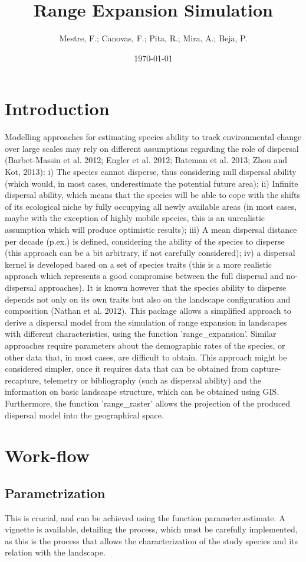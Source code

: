 \documentclass{article}\usepackage[]{graphicx}\usepackage[]{xcolor}
\title{Range Expansion Simulation}
\author{Mestre, F.; Canovas, F.; Pita, R.; Mira, A.; Beja, P.}
\date{\today}
\begin{document}
\maketitle

\section{Introduction}
Modelling approaches for estimating species ability to track environmental change over large scales may rely on different assumptions regarding the role of dispersal (Barbet-Massin  et al. 2012; Engler et al. 2012; Bateman et al. 2013; Zhou and Kot, 2013): i) The species cannot disperse, thus considering null dispersal ability (which would, in most cases, underestimate the potential future area); ii) Infinite dispersal ability, which means that the species will be able to cope with the shifts of its ecological niche by fully occupying all newly available areas (in most cases, maybe with the exception of highly mobile species, this is an unrealistic assumption which will produce optimistic results); iii) A mean dispersal distance per decade (p.ex.) is defined, considering the ability of the species to disperse (this approach can be a bit arbitrary, if not carefully considered); iv) a dispersal kernel is developed based on a set of species traits (this is a more realistic approach which represents a good compromise between the full dispersal and no-dispersal approaches).
It is known however that the species ability to disperse depends not only on its own traits but also on the landscape configuration and composition (Nathan et al. 2012).  This package allows a simplified approach to derive a dispersal model from the simulation of range expansion in landscapes with different characteristics, using the function 'range\_expansion'. Similar approaches require parameters about the demographic rates of the species, or other data that, in most cases, are difficult to obtain. This approach might be considered simpler, once it requires data that can be obtained from capture-recapture, telemetry or bibliography (such as dispersal ability) and the information on basic landscape structure, which can be obtained using GIS.
Furthermore, the function 'range\_raster' allows the projection of the produced dispersal model into the geographical space.

\section{Work-flow}
\subsection{Parametrization}
This is crucial, and can be achieved using the function parameter.estimate. A vignette is available, detailing the process, which must be carefully implemented, as this is the process that allows the characterization of the study species and its relation with the landscape.
\end{document}
